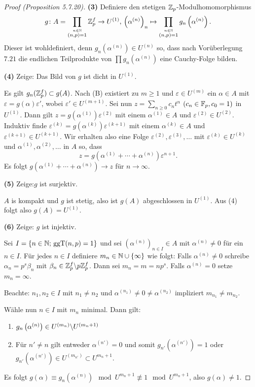 \begin{proof}[Proof (Proposition 5.7.20)]
	\bigskip \textbf{(3)} Definiere den stetigen $\mathbb{Z}_p$-Modulhomomorphismus
	\[ g \colon A = \prod_{\stackrel{n \in \mathbb{N}}{(n,p) = 1}} \mathbb{Z}_p^f \to U^{(1)}, \,
		\left( \alpha^{(n)} \right)_n \mapsto 
			\prod_{\stackrel{n \in \mathbb{N}}{(n,p) = 1}} g_n \left( \alpha^{(n)} \right).
	\]
	Dieser ist wohldefiniert, denn $ g_n \left( \alpha^{(n)} \right) \in U^{(n)}$ so, dass nach Vorüberlegung $7.21$ die endlichen Teilprodukte von $\prod g_n \left( \alpha^{(n)} \right)$ eine Cauchy-Folge bilden.
	
	\bigskip \textbf{(4)} Zeige: Das Bild von $g$  ist dicht in $U^{(1)}$.
	
	\bigskip Es gilt $g_n(\mathbb{Z}_p^f) \subset g(A)$. Nach (B) existiert zu $m\geq 1$ und $\varepsilon \in U^{(m)}$ ein $\alpha \in A$ mit $\varepsilon = g(\alpha) \varepsilon'$, wobei $\varepsilon' \in U^{(m+1)}$. Sei nun $ z = \sum_{n \geq 0} c_n t^n$ $(c_n \in \mathbb{F}_p, c_0 = 1)$ in $U^{(1)}$.
	Dann gilt $z = g \left( \alpha^{(1)} \right) \varepsilon^{(2)}$ mit einem $\alpha^{(1)} \in A$ und $\varepsilon^{(2)} \in U^{(2)}$.   Induktiv finde  $\varepsilon^{(k)} = g \left( \alpha^{(k)} \right) \varepsilon^{(k+1)}$ mit einem $\alpha^{(k)} \in A$ und $\varepsilon^{(k+1)} \in U^{(k+1)}$.  
	Wir erhalten also eine Folge $\varepsilon^{(2)}, \varepsilon^{(3)}, \dots$ mit $\varepsilon^{(k)} \in U^{(k)}$ und $\alpha^{(1)}, \alpha^{(2)}, \dots$ in $A$ so, dass
	\[ z = g \left( \alpha^{(1)} + \cdots + \alpha^{(n)} \right) \varepsilon^{n+1}.
	\]
	Es folgt $g \left( \alpha^{(1)} + \cdots + \alpha^{(n)} \right) \to z$ für $n\to\infty$.
	
	\bigskip \textbf{(5)} Zeige:$g$ ist surjektiv.
	
	\bigskip $A$ is kompakt und $g$ ist stetig, also ist $g(A)$ abgeschlossen in $U^{(1)}$. Aus (4) folgt also $g(A) =U^{(1)}$.
	
	\bigskip \textbf{(6)} Zeige: $g$ ist injektiv.
	
	\bigskip Sei $I = \{ n \in \mathbb{N}; \, \operatorname{ggT}(n,p) = 1 \}$ und sei $\left(\alpha^{(n)}\right)_{n\in I} \in A$ mit $\alpha^{(n)} \neq 0$ für ein $n \in I$.
	Für jedes $n \in I$ definiere $m_n \in \mathbb{N} \cup \{ \infty \}$ wie folgt: Falls $\alpha^{(n)} \neq 0$  schreibe 
	$\alpha_n = p^s \beta_n$ mit $\beta_n \in \mathbb{Z}_p^f \backslash p \mathbb{Z}_p^f$. Dann sei $m_n = m = np^s$.
	Falls $\alpha^{(n)} = 0$ setze $m_n = \infty$.
	
	\bigskip Beachte: $n_1, n_2 \in I$ mit $n_1 \neq n_2$ und $\alpha^{(n_1)} \neq 0 \neq  \alpha^{(n_2)}$ impliziert $m_{n_1} \neq m_{n_2}$.
	
	\bigskip Wähle nun $n \in I$ mit $m_n$ minimal. Dann gilt:
	\begin{enumerate}[(1)]
		\item $g_n\left( \alpha^{(n)} \right) \in U^{(m_n)} \backslash U^{(m_n+1)}$
		\item Für $n' \neq n$ gilt entweder $\alpha^{(n')} = 0$ und somit $g_{n'} \left( \alpha^{(n')}\right) = 1 $ oder $g_{n'} \left( \alpha^{(n')}\right) \in U^{(m_{n'})} \subset U^{m_n+1}$.
	\end{enumerate}
	Es folgt $g(\alpha) \equiv g_n \left( \alpha^{(n)}\right) \mod U^{m_n+1} \not \equiv 1 \mod U^{m_n+1}$, also $g(\alpha) \neq 1$.
\end{proof}

